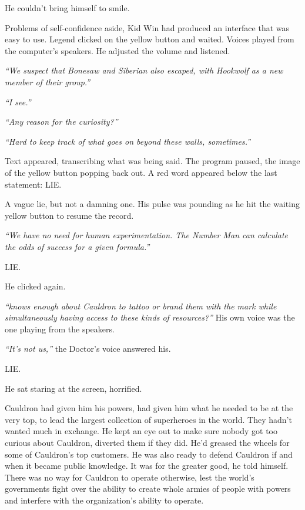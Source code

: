 He couldn't bring himself to smile.



Problems of self-confidence aside, Kid Win had produced an interface that was easy to use.  Legend clicked on the yellow button and waited.  Voices played from the computer's speakers.  He adjusted the volume and listened.



\emph{``We suspect that Bonesaw and Siberian also escaped, with Hookwolf as a new member of their group.''}



\emph{``I see.''}



\emph{``Any reason for the curiosity?''}



\emph{``Hard to keep track of what goes on beyond these walls, sometimes.''}



Text appeared, transcribing what was being said.  The program paused, the image of the yellow button popping back out.  A red word appeared below the last statement: LIE.



A vague lie, but not a damning one.  His pulse was pounding as he hit the waiting yellow button to resume the record.



\emph{``We have no need for human experimentation.  The Number Man can calculate the odds of success for a given formula.''}



LIE.



He clicked again.



\emph{``\ldotsWho knows enough about Cauldron to tattoo or brand them with the mark while simultaneously having access to these kinds of resources?''  }His own voice was the one playing from the speakers.



\emph{``It's not us,''} the Doctor's voice answered his.



LIE.



He sat staring at the screen, horrified.



Cauldron had given him his powers, had given him what he needed to be at the very top, to lead the largest collection of superheroes in the world.  They hadn't wanted much in exchange.  He kept an eye out to make sure nobody got too curious about Cauldron, diverted them if they did.  He'd greased the wheels for some of Cauldron's top customers.  He was also ready to defend Cauldron if and when it became public knowledge.  It was for the greater good, he told himself.  There was no way for Cauldron to operate otherwise, lest the world's governments fight over the ability to create whole armies of people with powers and interfere with the organization's ability to operate.



